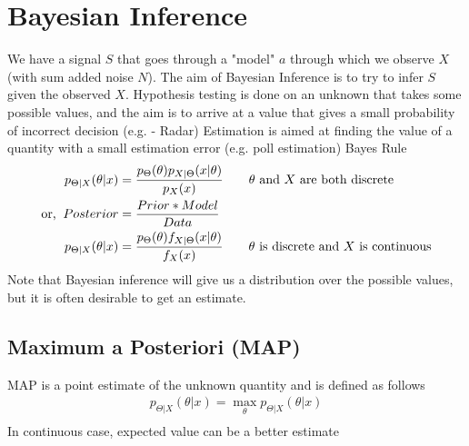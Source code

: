 \documentclass[11pt, a4paper]{article}
\begin{document}
    \section{Bayesian Inference}
    We have a signal $S$ that goes through a "model" $a$ through which we observe $X$ (with sum added noise $N$). The aim of Bayesian Inference is to try to infer $S$ given the observed $X$.
    \newline
    Hypothesis testing is done on an unknown that takes some possible values, and the aim is to arrive at a value that gives a small probability of incorrect decision (e.g. - Radar)
    \newline
    Estimation is aimed at finding the value of a quantity with a small estimation error (e.g. poll estimation)
    \newline
    Bayes Rule
    \begin{align*}
        p_{\Theta|X}(\theta|x) &= \frac{p_{\Theta}(\theta)p_{X|\Theta}(x|\theta)}{p_{X}(x)} \tag*{$\theta$ and $X$ are both discrete}\\
        \text{or,\;\;} Posterior &= \frac{Prior * Model}{Data}\\
        p_{\Theta|X}(\theta|x) &= \frac{p_{\Theta}(\theta)f_{X|\Theta}(x|\theta)}{f_{X}(x)} \tag*{$\theta$ is discrete and $X$ is continuous}\\
    \end{align*}
    Note that Bayesian inference will give us a distribution over the possible values, but it is often desirable to get an estimate.

    \subsection{Maximum a Posteriori (MAP)}
    MAP is a point estimate of the unknown quantity and is defined as follows
    \begin{align*}
        p_{\Theta|X}(\theta|x) = \max_{\theta}p_{\Theta|X}(\theta|x) \tag*{$\theta$ with maximum posterior probability}\\
    \end{align*}
    In continuous case, expected value can be a better estimate
\end{document}
